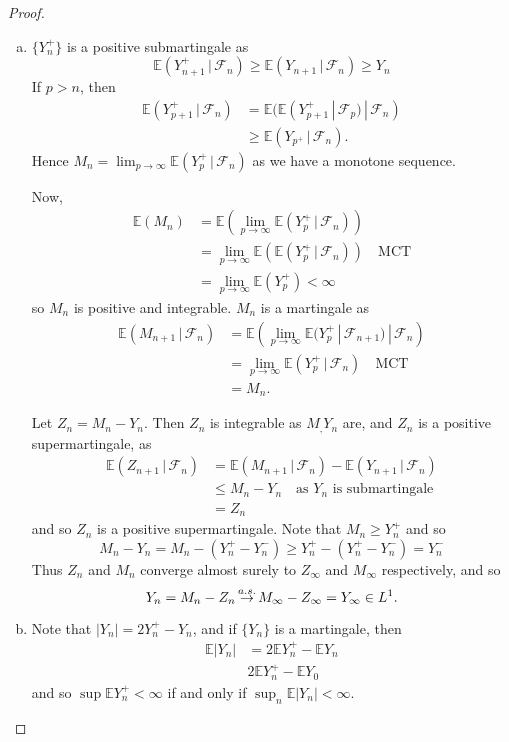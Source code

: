 \documentclass[10pt, oneside, reqno]{amsart}
\theoremstyle{plain}%
\theoremstyle{definition}
\theoremstyle{remark}
\newcommand{\given}{ \, | \,}
\newcommand{\sigf}{\mathcal{F}}
\newcommand{\E}{\mathbb{E}}
\def\cas{\,{\buildrel a.s. \over \rightarrow}\,}
\begin{document}
\begin{proof}{\ }
	\begin{enumerate}[(a)]
		\item $\{ Y_n^+ \}$ is a positive submartingale as \[
			\E(Y_{n+1}^+ \given \sigf_n) \geq \E(Y_{n+1} \given \sigf_n) \geq Y_n
		\]  If $p > n$, then \begin{align*}
			\E(Y_{p+1}^+ \given \sigf_n) &= \E(\E(Y_{p+1}^+ \given \sigf_p) \given \sigf_n) \\
			&\geq \E(Y_{p^+} \given \sigf_n). 
		\end{align*}   Hence $M_n = \lim_{p \rightarrow \infty}\E(Y_p^+ \given \sigf_n)$ as we have a monotone sequence.   
		
		Now, \begin{align*}
			\E(M_n) &= \E\left(\lim_{p \rightarrow \infty} \E(Y_p^+ \given \sigf_n) \right) \\
			&= \lim_{p \rightarrow \infty} \E(\E( Y_p^+ \given \sigf_n)) \quad \text{MCT} \\
			&= \lim_{p \rightarrow \infty} \E(Y_p^+) < \infty
		\end{align*} so $M_n$ is positive and integrable.  $M_n$ is a martingale as \begin{align*}
			\E(M_{n+1} \given \sigf_n) &= \E\left(\lim_{p \rightarrow \infty} \E(Y_p^+ \given \sigf_{n+1}) \given \sigf_n \right)  \\
			&= \lim_{p \rightarrow \infty} \E(Y_p^+ \given \sigf_n) \quad \text{MCT} \\
			&= M_n.
		\end{align*}  
		
		Let $Z_n = M_n - Y_n$. Then $Z_n$ is integrable as $M_, Y_n$ are, and $Z_n$ is a positive supermartingale, as \begin{align*}
			\E(Z_{n+1} \given \sigf_n) &= \E(M_{n+1} \given \sigf_n) - \E(Y_{n+1} \given \sigf_n) \\
			&\leq M_n - Y_n \quad \text{as $Y_n$ is submartingale} \\
			&= Z_n
		\end{align*} and so $Z_n$ is a positive supermartingale.  Note that $M_n \geq Y_{n}^+$ and so \[
			M_n - Y_n = M_n -(Y_n^+ - Y_n^-) \geq Y_n^+ - (Y_n^+ - Y_n^-) = Y_n^-
		\]  Thus $Z_n$ and $M_n$ converge almost surely to $Z_\infty$ and $M_\infty$ respectively, and so \[
			Y_n = M_n - Z_n \cas M_\infty - Z_\infty = Y_\infty \in L^1.  
		\]
		\item Note that $|Y_n| = 2Y_n^+ - Y_n$, and if $\{ Y_n \}$ is a martingale, then \begin{align*}
			\E |Y_n| &= 2 \E Y_n^+ - \E Y_n \\
			& 2 \E Y_n^+ - \E Y_0 
		\end{align*} and so $\sup \E Y_n^+ < \infty$ if and only if $\sup_n \E |Y_n| < \infty$.  
	\end{enumerate}
\end{proof}
\end{document}

